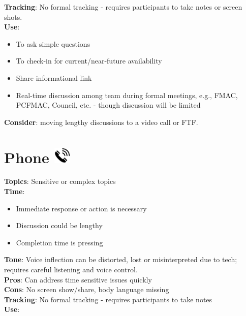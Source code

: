 \documentclass[
  letterpaper,
  DIV=11,
  numbers=noendperiod]{scrreprt}
\providecommand{\tightlist}{%
  \setlength{\itemsep}{0pt}\setlength{\parskip}{0pt}}\usepackage{longtable,booktabs,array}
\begin{document}
\textbf{Tracking}: No formal tracking - requires participants to take
notes or screen shots.\\
\textbf{Use}:

\begin{itemize}
\tightlist
\item
  To ask simple questions\\
\item
  To check-in for current/near-future availability\\
\item
  Share informational link\\
\item
  Real-time discussion among team during formal meetings, e.g., FMAC,
  PCFMAC, Council, etc. - though discussion will be limited
\end{itemize}

\textbf{Consider}: moving lengthy discussions to a video call or FTF.

\section[Phone ]{\texorpdfstring{Phone
\protect\includegraphics[width=\textwidth,height=0.3125in]{_img/phone_icon.png}}{Phone }}\label{phone}

\textbf{Topics}: Sensitive or complex topics\\
\textbf{Time}:

\begin{itemize}
\tightlist
\item
  Immediate response or action is necessary\\
\item
  Discussion could be lengthy\\
\item
  Completion time is pressing
\end{itemize}

\textbf{Tone}: Voice inflection can be distorted, lost or misinterpreted
due to tech; requires careful listening and voice control.\\
\textbf{Pros}: Can address time sensitive issues quickly\\
\textbf{Cons}: No screen show/share, body language missing\\
\textbf{Tracking}: No formal tracking - requires participants to take
notes\\
\textbf{Use}:
\end{document}
